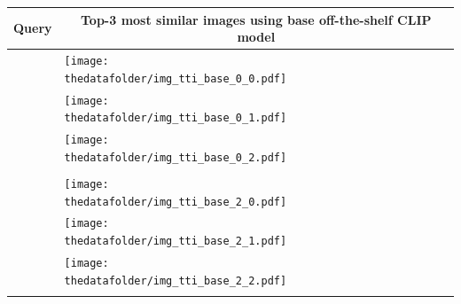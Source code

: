 \documentclass{article} %
\begin{document}
   \begin{table}[h!]
     \centering
     \begin{tabular}{m{2.7cm} p{2.9cm} p{2.9cm} p{2.9cm}}
         \toprule
         \centering \bfseries Query & \multicolumn{3}{c}{\bfseries{Top-3 most similar images using \textcolor{deeppurple}{base off-the-shelf CLIP model}}} \tabularnewline
         \midrule
          \texttt{} \vspace{20mm} & \centering \texttt{[image: \\thedatafolder/img\_tti\_base\_0\_0.pdf]} \\  & \centering \texttt{[image: \\thedatafolder/img\_tti\_base\_0\_1.pdf]} \\  & \centering \texttt{[image: \\thedatafolder/img\_tti\_base\_0\_2.pdf]} \\  \tabularnewline
         \midrule
         \texttt{} \vspace{20mm} & \centering \texttt{[image: \\thedatafolder/img\_tti\_base\_2\_0.pdf]} \\  & \centering \texttt{[image: \\thedatafolder/img\_tti\_base\_2\_1.pdf]} \\  & \centering \texttt{[image: \\thedatafolder/img\_tti\_base\_2\_2.pdf]} \\  \tabularnewline 

\end{tabular}
\end{table}
\end{document}
